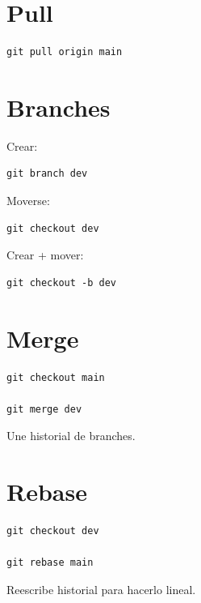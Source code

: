 \documentclass[a4paper,11pt]{article}
\begin{document}

\section*{Pull}

\begin{lstlisting}
git pull origin main
\end{lstlisting}


\section*{Branches}

Crear:
\begin{lstlisting}
git branch dev
\end{lstlisting}

Moverse:
\begin{lstlisting}
git checkout dev
\end{lstlisting}

Crear + mover:
\begin{lstlisting}
git checkout -b dev
\end{lstlisting}


\section*{Merge}

\begin{lstlisting}
git checkout main

git merge dev
\end{lstlisting}

Une historial de branches.


\section*{Rebase}

\begin{lstlisting}
git checkout dev

git rebase main
\end{lstlisting}

Reescribe historial para hacerlo lineal.
\end{document}
